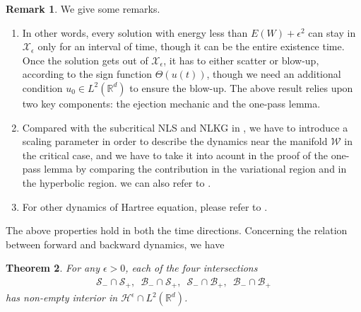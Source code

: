 \documentclass[reqno, 11pt]{amsart}
\numberwithin{equation}{section}
\theoremstyle{plain}
\newtheorem{theorem}{Theorem}
\theoremstyle{definition}
\newtheorem{remark}[theorem]{Remark}
\numberwithin{equation}{section}
\numberwithin{theorem}{section}
\numberwithin{equation}{section}
\numberwithin{equation}{section}
\numberwithin{theorem}{section}
\begin{document}
	\begin{remark} We give some remarks.
		\begin{enumerate}
			\item 
			In other words, every solution with energy less than $E(W)+\epsilon ^2$ can stay in $\mathcal{X}_\epsilon$ only for an interval of time, though it can be the entire existence time. Once the solution gets out of $\mathcal{X}_\epsilon$, it has to either scatter or blow-up, according to the sign function $\Theta\left( u(t) \right)$, though we need an additional condition $u_0\in L^2\left( \mathbb{R}^d \right)$ to ensure the blow-up. The above result relies upon two key components: the ejection mechanic and the one-pass lemma. 
			
			\item 
			Compared with the subcritical NLS and NLKG in \cite{KriNS:NLKG, NakS:NLKG, NakS:book, NakS:NLS, NakS:NLKG:non}, we have to introduce a scaling parameter in order to describe the dynamics near the manifold $
			\mathcal{W}$ in the critical case, and we have to take it into acount in the proof of the one-pass lemma by comparing the contribution in the variational region and in the hyperbolic region. we can also refer to \cite{KriNS:NLW rad, KriNS:NLW non, NakR,Roy}. 
			
			\item 
			For other dynamics of Hartree equation, please refer to \cite{CaoG,GinV:Hart,KriLR:crit Hart,KriMR:subcrit Hart,LiMZ:crit Hart,LiZh:class Hart,LLTX:g-Hart, MXZ:crit Hart:def rad,MXZ:subcrit Hart,MXZ:m crit Hart,MXZ:m crit Hart:blowup,MXZ:crit Hart:def non, Nak:Hart, Zhou}.  
			
		\end{enumerate}
	\end{remark}
	
	The above properties hold in both the time directions. Concerning the relation between forward and backward dynamics, we have
	
	\begin{theorem}\label{thm:exist} For any $\epsilon>0$, each of the four intersections 
		\begin{equation*}
		\begin{aligned}
		\mathcal{S}_{-} \cap \mathcal{S}_{+}, \enspace \mathcal{B}_{-} \cap \mathcal{S}_{+},\enspace \mathcal{S}_{-} \cap \mathcal{B}_{+},\enspace \mathcal{B}_{-} \cap \mathcal{B}_{+}
		\end{aligned}
		\end{equation*}
		has non-empty interior in $\mathcal{H}^\epsilon \cap L^2\left( \mathbb{R}^d \right)$.
	\end{theorem}	
	
\end{document}
